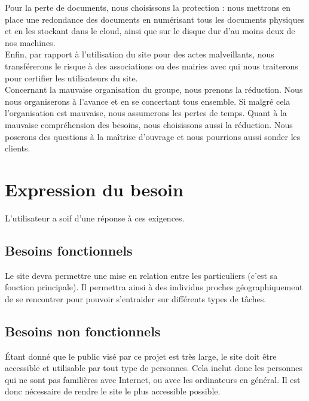 \documentclass[a4paper,11pt]{article}
\begin{document}
Pour la perte de documents, nous choisissons la protection : nous mettrons en place une redondance
des documents en numérisant tous les documents physiques et en les stockant dans le cloud, ainsi
que sur le disque dur d’au moins deux de nos machines.\\

Enfin, par rapport à l’utilisation du site pour des actes malveillants, nous transférerons le risque à des
associations ou des mairies avec qui nous traiterons pour certifier les utilisateurs du site.\\

Concernant la mauvaise organisation du groupe, nous prenons la réduction. Nous nous organiserons
à l'avance et en se concertant tous ensemble. Si malgré cela l'organisation est mauvaise, nous
assumerons les pertes de temps. Quant à la mauvaise compréhension des besoins, nous choisissons
aussi la réduction. Nous poserons des questions à la maîtrise d'ouvrage et nous pourrions aussi sonder
les clients.\\

\section{Expression du besoin}

L’utilisateur a soif d’une réponse à ces exigences.

\subsection{Besoins fonctionnels}

Le site devra permettre une mise en relation entre les particuliers (c’est sa fonction principale). Il
permettra ainsi à des individus proches géographiquement de se rencontrer pour pouvoir s’entraider
sur différents types de tâches.\\

\subsection{Besoins non fonctionnels}

Étant donné que le public visé par ce projet est très large, le site doit être accessible et utilisable par
tout type de personnes. Cela inclut donc les personnes qui ne sont pas familières avec Internet, ou
avec les ordinateurs en général. Il est donc nécessaire de rendre le site le plus accessible possible.\\
\end{document}
